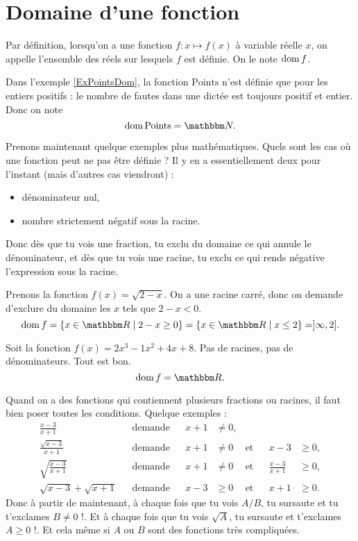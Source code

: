 %
   \section{Domaine d'une fonction}
%

Par définition, lorsqu'on a une fonction $f\colon x\mapsto f(x)$ à variable réelle $x$, on appelle  l'ensemble des réels sur lesquels $f$ est définie. On le note $\operatorname{dom} f$.


Dans l'exemple \ref{ExPointsDom}, la fonction $\mathrm{Points}$ n'est définie que pour les entiers positifs : le nombre de fautes dans une dictée est toujours positif et entier. Donc on note
\[ 
  \dom\mathrm{Points}=\eN.
\]

Prenons maintenant quelque exemples plus mathématiques. Quels sont les cas où une fonction peut ne pas être définie ? Il y en a essentiellement deux pour l'instant (mais d'autres cas viendront) :
\begin{itemize}
\item dénominateur nul,
\item nombre strictement négatif sous la racine.
\end{itemize}
Donc dès que tu vois une fraction, tu exclu du domaine ce qui annule le dénominateur, et dès que tu vois une racine, tu exclu ce qui rends négative l'expression sous la racine.

\begin{exemple}
Prenons la fonction $f(x)=\sqrt{2-x}$. On a une racine carré, donc on demande d'exclure du domaine les $x$ tels que $2-x<0$.
\[ 
  \dom f=\{ x\in\eR\tq 2-x\geq 0 \}=\{ x\in\eR\tq x\leq 2 \}=]\infty,2].
\]
\end{exemple}

\begin{exemple}
Soit la fonction $f(x)=2x^3-1x^2+4x+8$. Pas de racines, pas de dénominateurs. Tout est bon.
\[ 
  \dom f=\eR.
\]
\end{exemple}

Quand on a des fonctions qui contiennent plusieurs fractions ou racines, il faut bien poser toutes les conditions. Quelque exemples :
\begin{align}
\frac{ x-3 }{ x+1 }			&&\text{demande}	&&x+1&\neq 0,\\
\frac{ \sqrt{x-3} }{ x+1 }		&&\text{demande}	&&x+1&\neq 0	&\text{et}	&&x-3&\geq 0,\\
\sqrt{\frac{ x-3 }{ x+1 }}		&&\text{demande}	&&x+1&\neq 0	&\text{et}	&&\frac{ x-3 }{ x+1 }&\geq 0,\\
\sqrt{x-3}+\sqrt{x+1}			&&\text{demande}	&&x-3&\geq 0	&\text{et}	&&x+1&\geq 0.
\end{align}
Donc à partir de maintenant, à chaque fois que tu vois $A/B$, tu sursaute et tu t'exclames \og $B\neq 0$ !\fg. Et à chaque fois que tu vois $\sqrt{A}$, tu sursaute et t'exclames \og $A\geq 0$ !\fg. Et cela même si $A$ ou $B$ sont des fonctions très compliquées.

